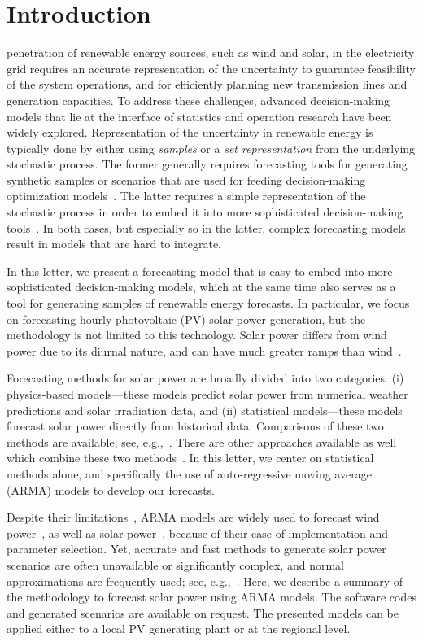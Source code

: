 \documentclass[letter]{IEEEtran}
\begin{document}
\section{Introduction}
 penetration of renewable energy sources, such as wind and solar, in 
the electricity grid requires an accurate representation of the 
uncertainty to guarantee feasibility of the system operations, and 
for efficiently planning new transmission lines and generation capacities. To 
address these challenges, advanced decision-making models that lie at the
interface of statistics and operation research have been widely 
explored.  Representation of the  uncertainty in renewable energy is typically  
done by either using \textit{samples} or a  \textit{set representation} from the 
underlying stochastic process. The former generally requires forecasting tools 
for generating synthetic samples or scenarios that are used for feeding 
decision-making optimization models~\cite{kleywegt2002sample}. The latter 
requires a simple representation of the stochastic process in 
order to embed it into more sophisticated decision-making 
tools~\cite{lorca2015adaptive}. In both cases, but especially so in the latter, 
complex forecasting models result in models that are hard to integrate. 

In this letter, we present a forecasting model that is easy-to-embed into more 
sophisticated decision-making models, which at the same time also serves as a 
tool for generating samples of renewable energy forecasts.  In 
particular, we focus on 
forecasting  hourly photovoltaic  (PV) solar power generation, but the 
methodology is not 
limited to this technology.  Solar power differs from wind power due 
to its diurnal nature, and can have much greater  ramps than 
wind~\cite{graabak2016variability}. 

Forecasting methods for solar power are broadly divided 
into two categories: (i) physics-based models---these models predict solar 
power 
from numerical weather predictions and solar irradiation data, and (ii) 
statistical models---these 
models forecast 
solar power directly from historical data. Comparisons of these two 
methods are available; see, 
e.g.,~\cite{huang2010comparative}. There are other 
approaches available as well which combine these two 
methods~\cite{dong2015novel}. 
In this letter, we center on  statistical  methods alone, and specifically the 
use of auto-regressive moving average (ARMA) 
models to develop our forecasts. 

Despite 
their limitations~\cite{yang2018history}, ARMA models
are widely used to forecast wind power~\cite{duran2007short}, as well as solar 
power~\cite{mora1998multiplicative}, because of their ease of 
implementation and parameter selection.  Yet, accurate and 
fast methods to generate solar power scenarios are often unavailable or 
significantly complex, and normal approximations are frequently used; see, 
e.g.,~\cite{su2014stochastic}. 
Here, 
we describe a summary of the methodology to forecast solar power using 
ARMA models. The software codes and generated scenarios are 
available on request. The presented models can 
be applied either to a local PV generating plant or  at the regional 
level.
\end{document}
